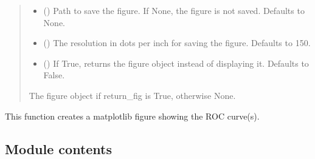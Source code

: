 \documentclass[letterpaper,10pt,english]{sphinxmanual}
\begin{document}
\begin{fulllineitems}
\begin{quote}
\begin{description}
\begin{itemize}
\item {} 
\sphinxAtStartPar
{} (\sphinxstyleliteralemphasis{\sphinxupquote{, }}) \textendash{} Path to save the figure. If None, the figure is not saved. Defaults to None.

\item {} 
\sphinxAtStartPar
{} (\sphinxstyleliteralemphasis{\sphinxupquote{, }}) \textendash{} The resolution in dots per inch for saving the figure. Defaults to 150.

\item {} 
\sphinxAtStartPar
{} (\sphinxstyleliteralemphasis{\sphinxupquote{, }}) \textendash{} If True, returns the figure object instead of displaying it. Defaults to False.

\end{itemize}

\sphinxAtStartPar
{} \textendash{} The figure object if return\_fig is True, otherwise None.

\end{description}\end{quote}

\sphinxAtStartPar
This function creates a matplotlib figure showing the ROC curve(s).

\end{fulllineitems}



\subsection{Module contents}
\label{\detokenize{calzone:module-calzone}}\label{\detokenize{calzone:module-contents}}

\renewcommand{\indexname}{Python Module Index}
\begin{sphinxtheindex}
\let\bigletter\sphinxstyleindexlettergroup
\bigletter{c}
\item\relax{}
\item\relax{}
\item\relax{}
\item\relax{}
\end{sphinxtheindex}

\renewcommand{\indexname}{Index}
\printindex
\end{document}
